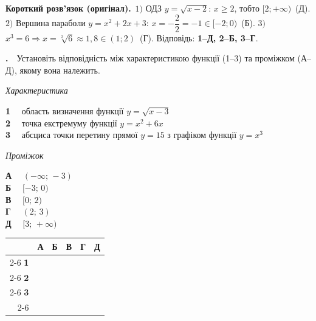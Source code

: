 \documentclass[12pt]{article}
\newcommand{\matchingGrid}{%
    \begingroup
    \renewcommand{\arraystretch}{1.15}
    \setlength{\tabcolsep}{4pt}
    \footnotesize
    \begin{tabular}{r|c|c|c|c|c|}
         \multicolumn{1}{c}{} & \multicolumn{1}{c}{\textbf{А}} & \multicolumn{1}{c}{\textbf{Б}} & \multicolumn{1}{c}{\textbf{В}} & \multicolumn{1}{c}{\textbf{Г}} & \multicolumn{1}{c}{\textbf{Д}} \\ \cline{2-6}
         \textbf{1} & \phantom{X} & \phantom{X} & \phantom{X} & \phantom{X} & \phantom{X} \\ \cline{2-6}
         \textbf{2} & & & & & \\ \cline{2-6}
         \textbf{3} & & & & & \\ \cline{2-6}
    \end{tabular}
    \endgroup
}
\newcounter{zad}
\newcommand{\zadtask}[1]{\stepcounter{zad}\noindent\textbf{\thezad.}\ \ #1\par\vspace{0.2cm}}
\newcommand{\solution}[1]{%
\par\vspace{0.12cm}
\begin{tcolorbox}[colback=titleBg!45, colframe=mainGreen!55, boxrule=0.4pt, arc=2pt,
    left=6pt, right=6pt, top=3pt, bottom=3pt, breakable]
\footnotesize\textbf{Короткий розв'язок (оригінал).}\ #1
\end{tcolorbox}
\par\vspace{0.12cm}
}
\begin{document}
\solution{$1)$ ОДЗ $y=\sqrt{x-2}$: $x\ge 2$, тобто $[2;+\infty)$~(Д). $2)$ Вершина параболи $y=x^2+2x+3$: $x=-\dfrac{2}{2}=-1\in[-2;0)$~(Б). $3)$ $x^3=6 \Rightarrow x=\sqrt[3]{6}\approx 1{,}8\in(1;2)$~(Г). Відповідь: \textbf{1--Д, 2--Б, 3--Г}.}
\zadtask{Установіть відповідність між характеристикою функції (1--3) та проміжком (А--Д), якому вона належить.

\vspace{0.3cm}

\noindent
\begin{minipage}[t]{0.52\textwidth}
\textit{Характеристика} \par \vspace{0.2cm}
\textbf{1} \ \ область визначення функції $y = \sqrt{x - 3}$\\[0.25cm]
\textbf{2} \ \ точка екстремуму функції $y = x^2 + 6x$\\[0.25cm]
\textbf{3} \ \ абсциса точки перетину прямої $y = 15$ з графіком функції $y = x^3$
\end{minipage}
\begin{minipage}[t]{0.24\textwidth}
\textit{Проміжок} \par \vspace{0.2cm}
\textbf{А} \ \ $(-\infty;\, -3)$\\[0.15cm]
\textbf{Б} \ \ $[-3;\, 0)$\\[0.15cm]
\textbf{В} \ \ $[0;\, 2)$\\[0.15cm]
\textbf{Г} \ \ $(2;\, 3)$\\[0.15cm]
\textbf{Д} \ \ $[3;\, +\infty)$
\end{minipage}
\hfill
\begin{minipage}[t]{0.22\textwidth}
\vspace{-0.2cm}
\begin{flushright}\matchingGrid\end{flushright}
\end{minipage}
}
\end{document}
